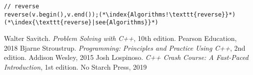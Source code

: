 \documentclass[10pt]{article}
\begin{document}
\begin{lstlisting}
// reverse
reverse(v.begin(),v.end());(*\index{Algorithms!\texttt{reverse}}*)(*\index{\texttt{reverse}|see{Algorithms}}*)
\end{lstlisting}
%
%
\small
\begin{thebibliography}{99}
 Walter Savitch. \textsl{Problem Solving with C++}, 10th edition. Pearson Education, 2018
 Bjarne Stroustrup. \textsl{Programming: Principles and Practice Using C++}, 2nd edition. Addison Wesley, 2015
 Josh Lospinoso. \textsl{C++ Crash Course: A Fast-Paced Introduction}, 1st edition. No Starch Press, 2019
\end{thebibliography}
%
%
\printindex
\end{document}
